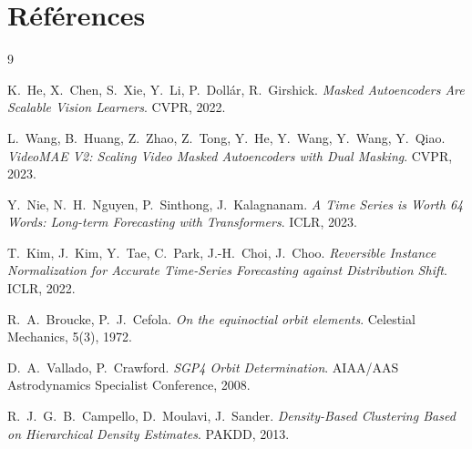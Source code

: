 \documentclass{article}
\begin{document}
\section{Références}

\begin{thebibliography}{9}

K.~He, X.~Chen, S.~Xie, Y.~Li, P.~Dollár, R.~Girshick.
\textit{Masked Autoencoders Are Scalable Vision Learners}. CVPR, 2022.

L.~Wang, B.~Huang, Z.~Zhao, Z.~Tong, Y.~He, Y.~Wang, Y.~Wang, Y.~Qiao.
\textit{VideoMAE V2: Scaling Video Masked Autoencoders with Dual Masking}. CVPR, 2023.

Y.~Nie, N.~H.~Nguyen, P.~Sinthong, J.~Kalagnanam.
\textit{A Time Series is Worth 64 Words: Long-term Forecasting with Transformers}. ICLR, 2023.

T.~Kim, J.~Kim, Y.~Tae, C.~Park, J.-H.~Choi, J.~Choo.
\textit{Reversible Instance Normalization for Accurate Time-Series Forecasting against Distribution Shift}. ICLR, 2022.

R.~A.~Broucke, P.~J.~Cefola.
\textit{On the equinoctial orbit elements}. Celestial Mechanics, 5(3), 1972.

D.~A.~Vallado, P.~Crawford.
\textit{SGP4 Orbit Determination}. AIAA/AAS Astrodynamics Specialist Conference, 2008.

R.~J.~G.~B.~Campello, D.~Moulavi, J.~Sander.
\textit{Density-Based Clustering Based on Hierarchical Density Estimates}. PAKDD, 2013.

\end{thebibliography}
\end{document}
